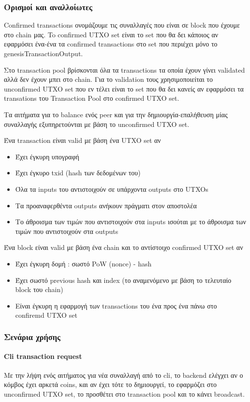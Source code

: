 \documentclass[a4paper,oneside, 12pt]{article}
\begin{document}
\subsubsection{Ορισμοί και αναλλοίωτες}
Confirmed transactions ονομάζουμε τις συναλλαγές που είναι σε block που έχουμε στο chain μας.
To confirmed UTXO set είναι το set που θα δει κάποιος αν εφαρμόσει ένα-ένα τα confirmed transactions στο set που περιέχει μόνο το genesisTransactionOutput. 

Στο transaction pool βρίσκονται όλα τα transactions τα οποία έχουν γίνει validated αλλά δεν έχουν μπει στο chain. Για το validation τους χρησιμοποιείται το unconfirmed UTXO set που εν τέλει είναι το set που θα δει κανείς αν εφαρμόσει τα transations του Transaction Pool στο confirmed UTXO set.

Τα αιτήματα για το balance ενός peer και για την δημιουργία-επαλήθευση μίας συναλλαγής εξυπηρετούνται με βάση το unconfirmed UTXO set.

Ένα transaction είναι valid με βάση ένα UTXO set αν
\begin{itemize}
	\item Έχει έγκυρη υπογραφή
	\item Έχει έγκυρο txid (hash των δεδομένων του)
	\item Όλα τα inputs του αντιστοιχούν σε υπάρχοντα outputs στο UTXOs
	\item Τα προαναφερθέντα outputs ανήκουν πράγματι στον αποστολέα
	\item Το άθροισμα των τιμών που αντιστοιχούν στα inputs ισούται με το άθροισμα των
	τιμών που αντιστοιχούν  στα outputs
\end{itemize}

Ένα block είναι valid με βάση ένα chain  και το αντίστοιχο confirmed UTXO set αν
\begin{itemize}
	\item Έχει έγκυρη δομή : σωστό PoW (nonce) - hash
	\item Έχει σωστό previous hash και index (το αναμενόμενο με βάση το τελευταίο block του chain)
	\item Είναι έγκυρη η εφαρμογή των transactions του ένα προς ένα πάνω στο confiremd UTXO set
\end{itemize}

\subsubsection{Σενάρια χρήσης}
\paragraph{Cli transaction request}
Με την λήψη ενός αιτήματος για νέα συναλλαγή από το cli, το backend ελέγχει αν ο κόμβος έχει αρκετά coins, και αν έχει τότε το δημιουργεί, το εφαρμόζει στο unconfirmed UTXO set, το προσθέτει στο transaction pool και το κάνει broadcast.
\end{document}
